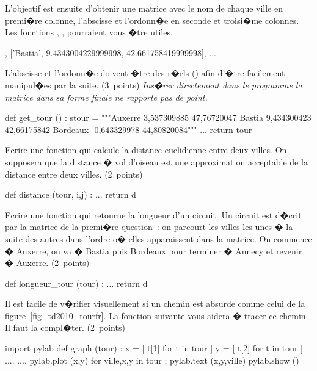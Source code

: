 \begin{xexercicenot}
L'objectif est ensuite d'obtenir une matrice avec le nom de chaque ville en premi�re colonne, l'abscisse et l'ordonn�e en seconde et troisi�me colonnes. Les fonctions , ,  pourraient vous �tre utiles.

\begin{verbatimx}
[['Auxerre', 3.537309885, 47.767200469999999], 
 ['Bastia', 9.4343004229999998, 42.661758419999998], 
 ...         
\end{verbatimx}

L'abscisse et l'ordonn�e doivent �tre des r�els () afin d'�tre facilement manipul�es par la suite. (3~points) \textit{Ins�rer directement dans le programme la matrice dans sa forme finale ne rapporte pas de point.}

\begin{verbatimx}
def get_tour () :
    stour = """Auxerre	3,537309885	47,76720047
Bastia	9,434300423	42,66175842
Bordeaux	-0,643329978	44,80820084"""
    ...
    return tour
\end{verbatimx}


\exequest Ecrire une fonction  qui calcule la distance euclidienne entre deux villes. On supposera que la distance � vol d'oiseau est une approximation acceptable de la distance entre deux villes. (2~points)

\begin{verbatimx}
def distance (tour, i,j) :
    ...
    return d
\end{verbatimx}

\exequest Ecrire une fonction  qui retourne la longueur d'un circuit. Un circuit est d�crit par la matrice de la premi�re question~: on parcourt les villes les unes � la suite des autres dans l'ordre o� elles apparaissent dans la matrice. On commence � Auxerre, on va � Bastia puis Bordeaux pour terminer � Annecy et revenir � Auxerre. (2~points)

\begin{verbatimx}
def longueur_tour (tour) :
    ...
    return d
\end{verbatimx}

\exequest Il est facile de v�rifier visuellement si un chemin est absurde comme celui de la figure~\ref{fig_td2010_tourfr}. La fonction suivante vous aidera � tracer ce chemin. Il faut la compl�ter. (2~points)

\begin{verbatimx}
import pylab
def graph (tour) :
    x = [ t[1] for t in tour ]
    y = [ t[2] for t in tour ]
    ....
    ....
    pylab.plot (x,y)
    for ville,x,y in tour :
        pylab.text (x,y,ville)
    pylab.show ()
\end{verbatimx}
    

\end{xexercicenot}
